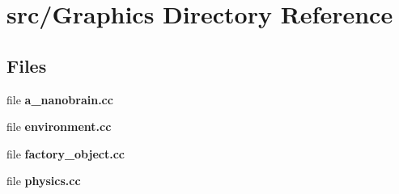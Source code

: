 \section{src/\+Graphics Directory Reference}
\label{dir_3419e189e460663ec2c964233bf8dcd6}
\subsection*{Files}
\begin{DoxyCompactItemize}
\item 
file {\bfseries a\+\_\+nanobrain.\+cc}
\item 
file {\bfseries environment.\+cc}
\item 
file {\bfseries factory\+\_\+object.\+cc}
\item 
file {\bfseries physics.\+cc}
\end{DoxyCompactItemize}
